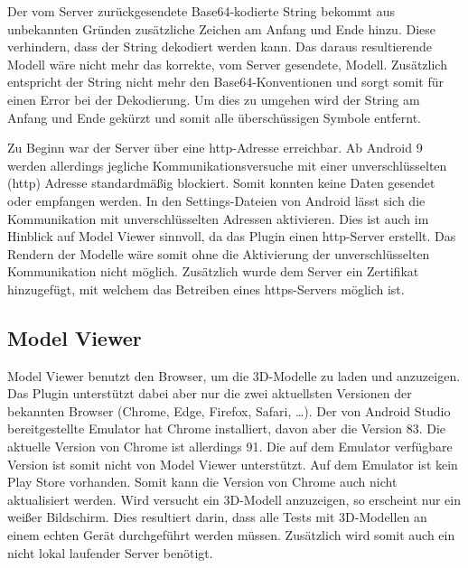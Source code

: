 Der vom Server zurückgesendete Base64-kodierte String bekommt aus unbekannten Gründen zusätzliche Zeichen am Anfang und Ende hinzu. Diese verhindern, dass der String dekodiert 
werden kann. Das daraus resultierende Modell wäre nicht mehr das korrekte, vom Server gesendete, Modell. Zusätzlich entspricht der String nicht mehr den Base64-Konventionen und 
sorgt somit für einen Error bei der Dekodierung. \newline
Um dies zu umgehen wird der String am Anfang und Ende gekürzt und somit alle überschüssigen Symbole entfernt.

Zu Beginn war der Server über eine http-Adresse erreichbar. Ab Android 9 werden allerdings jegliche Kommunikationsversuche mit einer unverschlüsselten (http) Adresse standardmäßig 
blockiert. Somit konnten keine Daten gesendet oder empfangen werden. \newline
In den Settings-Dateien von Android lässt sich die Kommunikation mit unverschlüsselten Adressen aktivieren. Dies ist auch im Hinblick auf Model Viewer sinnvoll, da das Plugin einen 
http-Server erstellt. Das Rendern der Modelle wäre somit ohne die Aktivierung der unverschlüsselten Kommunikation nicht möglich. \newline
Zusätzlich wurde dem Server ein Zertifikat hinzugefügt, mit welchem das Betreiben eines https-Servers möglich ist.

\subsection{Model Viewer}

Model Viewer benutzt den Browser, um die 3D-Modelle zu laden und anzuzeigen. Das Plugin unterstützt dabei aber nur die zwei aktuellsten Versionen der bekannten Browser 
(Chrome, Edge, Firefox, Safari, \dots). Der von Android Studio bereitgestellte Emulator hat Chrome installiert, davon aber die Version 83. Die aktuelle Version von Chrome ist allerdings 
91. Die auf dem Emulator verfügbare Version ist somit nicht von Model Viewer unterstützt. Auf dem Emulator ist kein Play Store vorhanden. Somit kann die Version von Chrome auch nicht 
aktualisiert werden. Wird versucht ein 3D-Modell anzuzeigen, so erscheint nur ein weißer Bildschirm. \newline
Dies resultiert darin, dass alle Tests mit 3D-Modellen an einem echten Gerät durchgeführt werden müssen. Zusätzlich wird somit auch ein nicht lokal laufender Server benötigt.